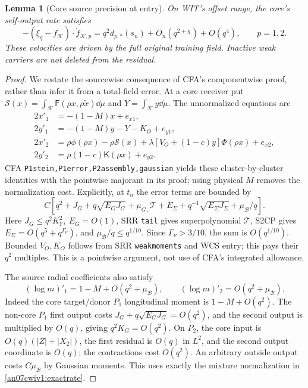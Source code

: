 \documentclass[11pt]{article}
\numberwithin{equation}{section}
\newtheorem{lemma}[theorem]{Lemma}
\theoremstyle{remark}\newtheorem{remark}[theorem]{Remark}
\newcommand{\KK}{\mathcal K}\newcommand{\BB}{\mathcal B}
\newcommand{\Gp}{{G_+}}\newcommand{\CC}{\mathcal C}
\newcommand{\Kfun}{\mathsf K}\newcommand{\Ffun}{\mathsf F}
\begin{document}
\begin{lemma}[Core source precision at entry]
\label{an07cwiv1:corerates}
On WIT's offset range, the core's self-output rate satisfies
\begin{equation}
 -(\xi_q-f_\KK)\cdot\dot f_{\KK,p}
       =q^2d_{p,*}(s_n)+O_n(q^{2+\chi})+O(q^4),
       \qquad p=1,2.
 \label{an07cwiv1:corerateeq}
\end{equation}
These velocities are driven by the full original training
field. Inactive weak carriers are not deleted from the residual.
\end{lemma}
\begin{proof}
We restate the sourcewise consequence of CFA's componentwise
proof, rather than infer it from a total-field error.
At a core receiver put
\(\mathcal S(x)=\int_\KK\Ffun(\rho x,\rho\widetilde x)\dd\mu\)
and \(Y=\int_\KK y\dd\mu\). The unnormalized equations are
\begin{align*}
 2x'_1&=-(1-M)x+e_{x1},\\
 2y'_1&=-(1-M)y-Y-K_O+e_{y1},\\
 2x'_2&=\rho\phi(\rho x)-\rho\mathcal S(x)
            +\lambda[V_O+(1-c)y]\Phi(\rho x)+e_{x2},\\
 2y'_2&=\rho(1-c)\Kfun(\rho x)+e_{y2}.
\end{align*}
CFA \texttt{P1stein,P1error,P2assembly,gaussian} yields these
cluster-by-cluster identities with the pointwise majorant in
its proof; using physical \(M\) removes the normalization
cost. Explicitly, at \(t_n\) the error terms are bounded by
\[
 C[q^2+J_G+q\sqrt{E_GJ_G}
 +\mu_\Gp\mathcal T
 +E_\Sigma+q^{-1}\sqrt{E_\Sigma J_\Sigma}
 +\mu_\BB/q] .
 \]
Here \(J_G\le q^2K_Y^2,\ E_G=O(1)\), SRR
\texttt{tail} gives superpolynomial \(\mathcal T\), S2CP gives
\(E_\Sigma=O(q^5+q^{\Gamma_\nu})\), and
\(\mu_\BB/q\le q^{1/10}\).
Since \(\Gamma_\nu>3/10\), the sum is \(O(q^{1/10})\).
Bounded \(V_O,K_O\) follows from SRR \texttt{weakmoments}
and WCS entry; this pays their \(q^2\) multiples.
This is a pointwise argument, not use of CFA's integrated allowance.

The source radial coefficients also satisfy
\[
 (\log m)'_1=1-M+O(q^2+\mu_\BB),\qquad
 (\log m)'_2=O(q^2+\mu_\BB).
 \]
Indeed the core target/donor \(P_1\) longitudinal moment is
\(1-M+O(q^2)\). The non-core \(P_1\) first output costs
\(J_G+q\sqrt{E_GJ_G}=O(q^2)\), and the second output is
multiplied by \(O(q)\), giving \(q^2K_G=O(q^2)\).
On \(P_2\), the core input is \(O(q)(|Z|+|X_2|)\),
the first residual is \(O(q)\) in \(L^2\), and the second
output coordinate is \(O(q)\); the contractions cost
\(O(q^2)\). An arbitrary outside output costs \(C\mu_\BB\)
by Gaussian moments. This uses exactly the mixture
normalization in \eqref{an07cwiv1:exactrate}.


\end{proof}
\end{document}
